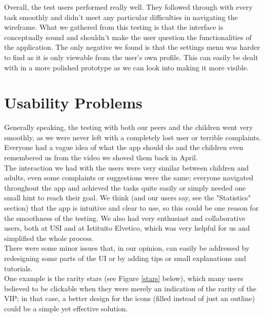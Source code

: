\documentclass[12pt]{scrartcl}
\begin{document}
	Overall, the test users performed really well. They followed through with every task smoothly and
	didn't meet any particular difficulties in navigating the wireframe. What we gathered from this
	testing is that the interface is conceptually sound and shouldn't make the user question the
	functionalities of the application. The only negative we found is that the settings menu was harder
	to find as it is only viewable from the user's own profile. This can easily be dealt with in a more
	polished prototype as we can look into making it more visible.
	
	\newpage

\section{Usability Problems}

	
	Generally speaking, the testing with both our peers and the children went very smoothly, as we were never left with a completely lost user or terrible complaints. Everyone had a vague idea of what the app should do and the children even remembered us from the video we shoved them back in April.\\
	
	The interaction we had with the users were very similar between children and adults, even some complaints or suggestions were the same; everyone navigated throughout the app and achieved the tasks quite easily or simply needed one small hint to reach their goal. We think (and our users say, see the "Statistics" section) that the app is intuitive and clear to use, so this could be one reason for the smoothness of the testing. We also had very enthusiast and collaborative users, both at USI and at Istituito Elvetico, which was very helpful for us and simplified the whole process.\\
	
	There were some minor issues that, in our opinion, can easily be addressed by redesigning some parts of the UI or by adding tips or small explanations and tutorials.\\
	One example is the rarity stars (see Figure \ref{stars} below), which many users believed to be clickable when they were merely an indication of the rarity of the VIP; in that case, a better design for the icons (filled instead of just an outline) could be a simple yet effective solution.\\
	
\end{document}
